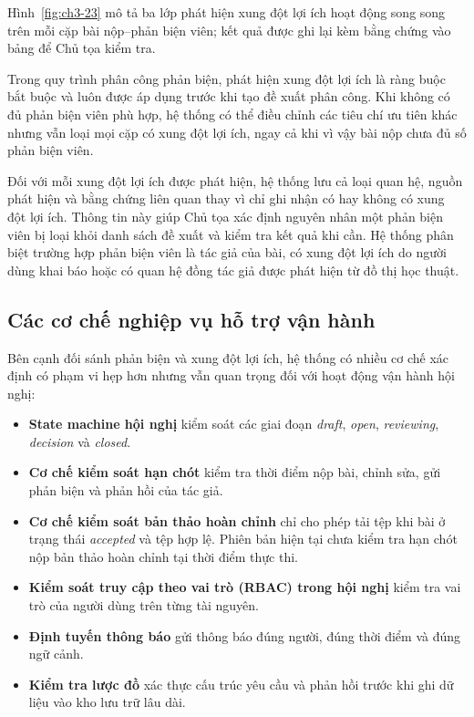 Hình~\ref{fig:ch3-23} mô tả ba lớp phát hiện xung đột lợi ích hoạt động song song trên mỗi cặp bài nộp--phản biện viên; kết quả được ghi lại kèm bằng chứng vào bảng  để Chủ tọa kiểm tra.

Trong quy trình phân công phản biện, phát hiện xung đột lợi ích là ràng buộc bắt buộc và luôn được áp dụng trước khi tạo đề xuất phân công. Khi không có đủ phản biện viên phù hợp, hệ thống có thể điều chỉnh các tiêu chí ưu tiên khác nhưng vẫn loại mọi cặp có xung đột lợi ích, ngay cả khi vì vậy bài nộp chưa đủ số phản biện viên.

Đối với mỗi xung đột lợi ích được phát hiện, hệ thống lưu cả loại quan hệ, nguồn phát hiện và bằng chứng liên quan thay vì chỉ ghi nhận có hay không có xung đột lợi ích. Thông tin này giúp Chủ tọa xác định nguyên nhân một phản biện viên bị loại khỏi danh sách đề xuất và kiểm tra kết quả khi cần. Hệ thống phân biệt trường hợp phản biện viên là tác giả của bài, có xung đột lợi ích do người dùng khai báo hoặc có quan hệ đồng tác giả được phát hiện từ đồ thị học thuật.


\subsection{Các cơ chế nghiệp vụ hỗ trợ vận hành}

Bên cạnh đối sánh phản biện và xung đột lợi ích, hệ thống có nhiều cơ chế xác định có phạm vi hẹp hơn nhưng vẫn quan trọng đối với hoạt động vận hành hội nghị:

\begin{itemize}
  \item \textbf{State machine hội nghị} kiểm soát các giai đoạn \textit{draft}, \textit{open}, \textit{reviewing}, \textit{decision} và \textit{closed}.
  \item \textbf{Cơ chế kiểm soát hạn chót} kiểm tra thời điểm nộp bài, chỉnh sửa, gửi phản biện và phản hồi của tác giả.
  \item \textbf{Cơ chế kiểm soát bản thảo hoàn chỉnh} chỉ cho phép tải tệp khi bài ở trạng thái \textit{accepted} và tệp hợp lệ. Phiên bản hiện tại chưa kiểm tra hạn chót nộp bản thảo hoàn chỉnh tại thời điểm thực thi.
  \item \textbf{Kiểm soát truy cập theo vai trò (RBAC) trong hội nghị} kiểm tra vai trò của người dùng trên từng tài nguyên.
  \item \textbf{Định tuyến thông báo} gửi thông báo đúng người, đúng thời điểm và đúng ngữ cảnh.
  \item \textbf{Kiểm tra lược đồ} xác thực cấu trúc yêu cầu và phản hồi trước khi ghi dữ liệu vào kho lưu trữ lâu dài.
\end{itemize}


